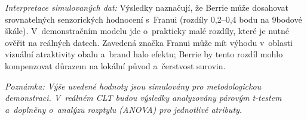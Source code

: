 \textit{Interpretace simulovaných dat:} Výsledky naznačují, že Berrie může dosahovat srovnatelných senzorických hodnocení s~Franui (rozdíly 0,2--0,4 bodu na 9bodové škále). V~demonstračním modelu jde o~prakticky malé rozdíly, které je nutné ověřit na reálných datech. Zavedená značka Franui může mít výhodu v~oblasti vizuální atraktivity obalu a~brand halo efektu; Berrie by tento rozdíl mohlo kompenzovat důrazem na lokální původ a~čerstvost surovin.

\textit{Poznámka: Výše uvedené hodnoty jsou simulovány pro metodologickou demonstraci. V~reálném CLT budou výsledky analyzovány párovým t-testem a~doplněny o~analýzu rozptylu (ANOVA) pro jednotlivé atributy.}
